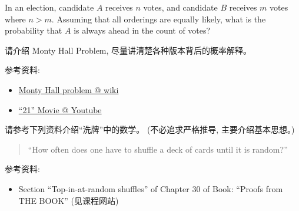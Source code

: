 \documentclass[a4paper, justified]{tufte-handout}
\begin{document}
\begin{solution}
\end{solution}

\begin{problem}[CS 5.4-10]
\end{problem}

\begin{solution}
\end{solution}

\begin{problem}[CS 5.4-15]
\end{problem}

\begin{solution}
\end{solution}

\beginoptional

\begin{problem}
  In an election, candidate $A$ receives $n$ votes, 
  and candidate $B$ receives $m$ votes where $n > m$.
  Assuming that all orderings are equally likely, 
  what is the probability that $A$ is always ahead in the count of votes?
\end{problem}

\begin{solution}
\end{solution}

\beginot

\begin{ot}
  请介绍 Monty Hall Problem, 尽量讲清楚各种版本背后的概率解释。

  \noindent 参考资料:
  \begin{itemize}
    \item \href{https://en.wikipedia.org/wiki/Monty\_Hall\_problem}{Monty Hall problem @ wiki}
    \item \href{https://www.youtube.com/watch?v=cXqDIFUB7YU}{``21'' Movie @ Youtube}
  \end{itemize}
\end{ot}

\begin{ot}
  \noindent 请参考下列资料介绍``洗牌''中的数学。
  (不必追求严格推导, 主要介绍基本思想。)

  \begin{quote}
    ``How often does one have to shuffle a deck of cards until it is random?''
  \end{quote}

  \noindent 参考资料:
  \begin{itemize}
    \item Section ``Top-in-at-random shuffles'' of Chapter 30 
      of Book: ``Proofs from THE BOOK'' (见课程网站)
  \end{itemize}
\end{ot}
\end{document}
